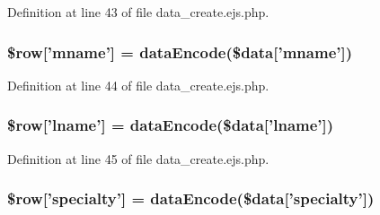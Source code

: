\-Definition at line 43 of file data\-\_\-create.\-ejs.\-php.

\hypertarget{miscellaneous_2mysettings_2data__create_8ejs_8php_a59969ea1bfb7b642d6dc27ce674d53c7}{
\subsubsection[{\$row}]{\setlength{\rightskip}{0pt plus 5cm}\$row\mbox{[}'mname'\mbox{]} = {\bf data\-Encode}(\$data\mbox{[}'mname'\mbox{]})}}\label{miscellaneous_2mysettings_2data__create_8ejs_8php_a59969ea1bfb7b642d6dc27ce674d53c7}


\-Definition at line 44 of file data\-\_\-create.\-ejs.\-php.

\hypertarget{miscellaneous_2mysettings_2data__create_8ejs_8php_a448ec3d1709d6ded284a6a9f4e6dbf5c}{
\subsubsection[{\$row}]{\setlength{\rightskip}{0pt plus 5cm}\$row\mbox{[}'lname'\mbox{]} = {\bf data\-Encode}(\$data\mbox{[}'lname'\mbox{]})}}\label{miscellaneous_2mysettings_2data__create_8ejs_8php_a448ec3d1709d6ded284a6a9f4e6dbf5c}


\-Definition at line 45 of file data\-\_\-create.\-ejs.\-php.

\hypertarget{miscellaneous_2mysettings_2data__create_8ejs_8php_a303951ab220aee0016b1d2fe9c668eb9}{
\subsubsection[{\$row}]{\setlength{\rightskip}{0pt plus 5cm}\$row\mbox{[}'specialty'\mbox{]} = {\bf data\-Encode}(\$data\mbox{[}'specialty'\mbox{]})}}\label{miscellaneous_2mysettings_2data__create_8ejs_8php_a303951ab220aee0016b1d2fe9c668eb9}


